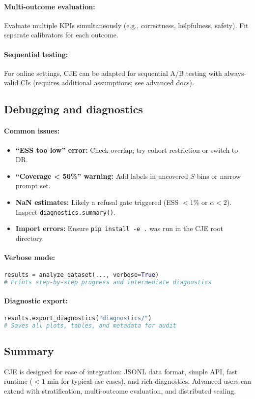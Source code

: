 \paragraph{Multi-outcome evaluation:} Evaluate multiple KPIs simultaneously (e.g., correctness, helpfulness, safety). Fit separate calibrators for each outcome.

\paragraph{Sequential testing:} For online settings, CJE can be adapted for sequential A/B testing with always-valid CIs (requires additional assumptions; see advanced docs).

\subsection{Debugging and diagnostics}

\paragraph{Common issues:}
\begin{itemize}
\item \textbf{``ESS too low'' error:} Check overlap; try cohort restriction or switch to DR.
\item \textbf{``Coverage < 50\%'' warning:} Add labels in uncovered $S$ bins or narrow prompt set.
\item \textbf{NaN estimates:} Likely a refusal gate triggered (ESS $< 1\%$ or $\alpha < 2$). Inspect \texttt{diagnostics.summary()}.
\item \textbf{Import errors:} Ensure \texttt{pip install -e .} was run in the CJE root directory.
\end{itemize}

\paragraph{Verbose mode:}
\begin{lstlisting}[language=Python]
results = analyze_dataset(..., verbose=True)
# Prints step-by-step progress and intermediate diagnostics
\end{lstlisting}

\paragraph{Diagnostic export:}
\begin{lstlisting}[language=Python]
results.export_diagnostics("diagnostics/")
# Saves all plots, tables, and metadata for audit
\end{lstlisting}

\subsection{Summary}

CJE is designed for ease of integration: JSONL data format, simple API, fast runtime ($< 1$ min for typical use cases), and rich diagnostics. Advanced users can extend with stratification, multi-outcome evaluation, and distributed scaling.
